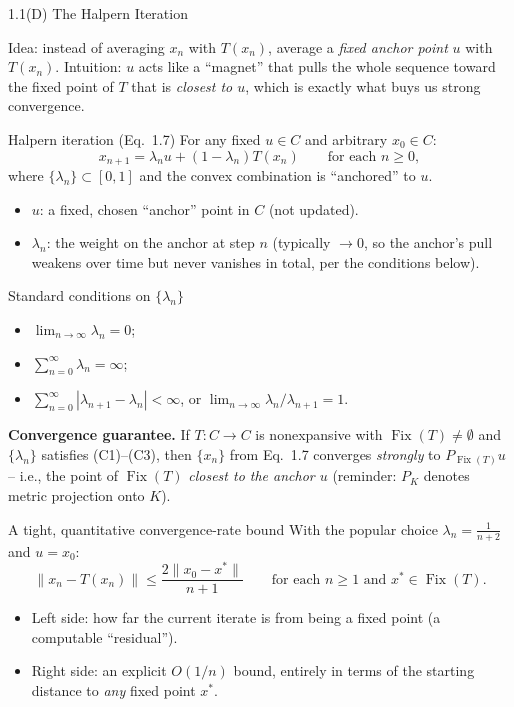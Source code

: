 \documentclass[aspectratio=169,10pt]{beamer}
\newcommand{\Fix}{\operatorname{Fix}}
\begin{document}
\begin{frame}[allowframebreaks]{1.1(D) The Halpern Iteration}

Idea: instead of averaging $x_n$ with $T(x_n)$, average a \emph{fixed
anchor point} $u$ with $T(x_n)$. Intuition: $u$ acts like a ``magnet''
that pulls the whole sequence toward the fixed point of $T$ that is
\emph{closest to $u$}, which is exactly what buys us strong convergence.

\begin{block}{Halpern iteration (Eq.\ 1.7)}
For any fixed $u\in C$ and arbitrary $x_0\in C$:
\[
  x_{n+1} = \lambda_n u + (1-\lambda_n)T(x_n) \qquad \text{for each } n\ge 0,
\]
where $\{\lambda_n\}\subset[0,1]$ and the convex combination is
``anchored'' to $u$.
\begin{itemize}
  \item $u$: a fixed, chosen ``anchor'' point in $C$ (not updated).
  \item $\lambda_n$: the weight on the anchor at step $n$ (typically
    $\to 0$, so the anchor's pull weakens over time but never vanishes in
    total, per the conditions below).
\end{itemize}
\end{block}

\begin{block}{Standard conditions on $\{\lambda_n\}$}
\begin{itemize}
  \item[(C1)] $\lim_{n\to\infty}\lambda_n = 0$;
  \item[(C2)] $\sum_{n=0}^\infty \lambda_n = \infty$;
  \item[(C3)] $\sum_{n=0}^\infty|\lambda_{n+1}-\lambda_n|<\infty$, or
    $\lim_{n\to\infty}\lambda_n/\lambda_{n+1}=1$.
\end{itemize}
\end{block}

\framebreak

\textbf{Convergence guarantee.} If $T:C\to C$ is nonexpansive with
$\Fix(T)\ne\emptyset$ and $\{\lambda_n\}$ satisfies (C1)--(C3), then
$\{x_n\}$ from Eq.\ 1.7 converges \emph{strongly} to $P_{\Fix(T)}u$ --
i.e., the point of $\Fix(T)$ \emph{closest to the anchor $u$} (reminder:
$P_K$ denotes metric projection onto $K$).

\begin{block}{A tight, quantitative convergence-rate bound}
With the popular choice $\lambda_n=\tfrac1{n+2}$ and $u=x_0$:
\[
  \|x_n-T(x_n)\| \le \frac{2\|x_0-x^*\|}{n+1}
  \qquad \text{for each } n\ge 1 \text{ and } x^*\in\Fix(T).
\]
\begin{itemize}
  \item Left side: how far the current iterate is from being a fixed
    point (a computable ``residual'').
  \item Right side: an explicit $O(1/n)$ bound, entirely in terms of the
    starting distance to \emph{any} fixed point $x^*$.
\end{itemize}
\end{block}


\end{frame}
\end{document}
